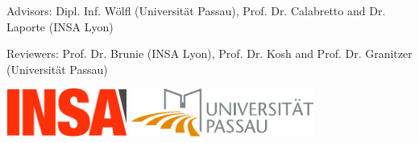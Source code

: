 %
%

\usepackage[
	plainpages=false,
	hidelinks,
	pdfpagelabels,
	pdftitle={\mytitle},
	pagebackref,
	pdfauthor={\myauthor},
	pdfkeywords={\keywords}
	]{hyperref}
\usepackage{memhfixc}

\usepackage{enumitem}







\VerbatimFootnotes

\title{\mytitle}
\author{\myauthor}

\ifx\mydate\undefined
\else
	\date{\mydate}
\fi

\mainmatter
\maketitle

Advisors: Dipl. Inf. Wölfl (Universität Passau), Prof. Dr. Calabretto and Dr. Laporte (INSA Lyon)

Reviewers: Prof. Dr. Brunie (INSA Lyon), Prof. Dr. Kosh and Prof. Dr. Granitzer (Universität Passau)

\vspace{4\baselineskip}

\includegraphics[height=60,width=150]{insa-logo.jpg}
\hspace{50}
\includegraphics[height=60,width=226]{passau-logo.png}

\setlength{\parindent}{0pt}

\ifx\mycopyright\undefined
\else
	\textcopyright{} \mycopyright
\fi

\setlength{\parindent}{1em}


